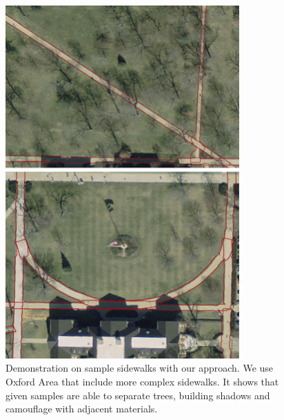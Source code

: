 \begin{figure}
    \centering
    \includegraphics[width=0.8\textwidth]{Figures/Oxford_success_complex.png}
    \caption[Sample Sidewalk 3]{Demonstration on sample sidewalks with our approach. We use Oxford Area that include more complex sidewalks. It shows that given samples are able to separate trees, building shadows and camouflage with adjacent materials.}
    \label{fig:oxford1}
\end{figure}

